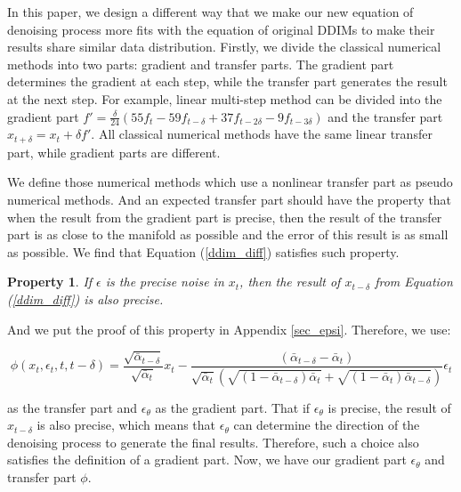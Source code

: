 \documentclass{article}
\newtheorem{property}{Property}[section]
\begin{document}
In this paper, we design a different way that we make our new equation of denoising process more fits with the equation of original DDIMs to make their results share similar data distribution. Firstly, we divide the classical numerical methods into two parts: gradient and transfer parts. The gradient part determines the gradient at each step, while the transfer part generates the result at the next step. For example, linear multi-step method can be divided into the gradient part $f'=\frac{\delta}{24}(55f_t-59f_{t-\delta}+37f_{t-2\delta}-9f_{t-3\delta})$ and the transfer part $x_{t+\delta}=x_t+\delta f'$. All classical numerical methods have the same linear transfer part, while gradient parts are different.

We define those numerical methods which use a nonlinear transfer part as pseudo numerical methods. And an expected transfer part should have the property that when the result from the gradient part is precise, then the result of the transfer part is as close to the manifold as possible and the error of this result is as small as possible. We find that Equation (\ref{ddim_diff}) satisfies such property.
\begin{property}
   If $\epsilon$ is the precise noise in $x_t$, then the result of $x_{t-\delta}$ from Equation (\ref{ddim_diff}) is also precise.
   \label{pro_pre}
   \vspace*{-0.4cm}
\end{property}
And we put the proof of this property in Appendix \ref{sec_epsi}. Therefore, we use: 

\begin{equation}
   \phi(x_t, \epsilon_t, t, t-\delta) = \frac{\sqrt{\bar{\alpha}_{t-\delta}}}{\sqrt{\bar{\alpha}_t}}x_t - 
   \frac{(\bar{\alpha}_{t-\delta}-\bar{\alpha}_t)}{\sqrt{\bar{\alpha}_t}(\sqrt{(1-\bar{\alpha}_{t-\delta})\bar{\alpha}_{t}} + \sqrt{(1-\bar{\alpha}_{t})\bar{\alpha}_{t-\delta}})}\epsilon_t
   \label{transfor}
\end{equation}

as the transfer part and $\epsilon_\theta$ as the gradient part. That if $\epsilon_\theta$ is precise, the result of $x_{t-\delta}$ is also precise, which means that $\epsilon_\theta$ can determine the direction of the denoising process to generate the final results. Therefore, such a choice also satisfies the definition of a gradient part. Now, we have our gradient part $\epsilon_\theta$ and transfer part $\phi$. 
\end{document}
